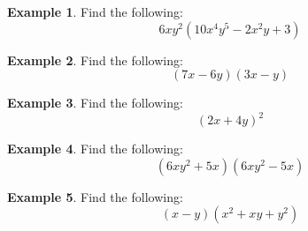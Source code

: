 \documentclass[addpoints,12pt]{exam}
\theoremstyle{definition}
\theoremstyle{break}
\theoremstyle{break}
\newtheorem{example}{Example}[subsection]
\begin{document}
\begin{example}
Find the following:
\[ 6xy^2(10x^4y^5-2x^2y+3)\]
\end{example}

\newpage

\begin{example}
Find the following:
\[ (7x-6y)(3x-y)\]
\vspace{1in}
\end{example}

\begin{example}
Find the following:
\[ (2x+4y)^2\]
\vspace{1in}
\end{example}

\begin{example}
Find the following:
\[ (6xy^2 + 5x)(6xy^2 - 5x)\]
\vspace{1in}
\end{example}

\begin{example}
Find the following:
\[ (x-y)(x^2+xy+y^2)\]
\end{example}
\end{document}
